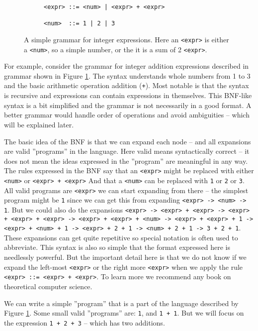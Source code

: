 \begin{figure}
\centering
\begin{subfigure}{.5\textwidth}
  \begin{verbatim}
<expr> ::= <num> | <expr> + <expr>

<num>  ::= 1 | 2 | 3
\end{verbatim}
\end{subfigure}
  \cprotect\caption{A simple grammar for integer expressions. Here an \verb|<expr>| is either a \verb|<num>|, so a simple number, or the it is a sum of 2 \verb|<expr>|.}
  \label{fig:bnfExpr}
\end{figure}
For example, consider the grammar for integer addition expressions described in grammar shown in Figure \ref{fig:bnfExpr}. The syntax understands whole numbers from 1 to 3 and the basic arithmetic operation addition (\verb!+!). Most notable is that the syntax is recursive and expressions can contain expressions in themselves. This BNF-like syntax is a bit simplified and the grammar is not necessarily in a good format. A better grammar would handle order of operations and avoid ambiguities -- which will be explained later.

The basic idea of the BNF is that we can expand each node -- and all expansions are valid ''programs'' in the language. Here valid means syntactically correct -- it does not mean the ideas expressed in the ''program'' are meaningful in any way. The rules expressed in the BNF say that an \verb|<expr>| might be replaced with either \verb|<num>| or \verb|<expr> + <expr>| And that a \verb|<num>| can be replaced with \verb|1| or \verb|2| or \verb|3|. All valid programs are \verb|<expr>| we can start expanding from there -- the simplest program might be \verb|1| since we can get this from expanding \verb|<expr> -> <num> -> 1|. But we could also do the expansions \verb|<expr> -> <expr> + <expr> -> <expr> + <expr> + <expr> -> <expr> + <expr> + <num> -> <expr> + <expr> + 1 -> <expr> + <num> + 1 -> <expr> + 2 + 1 -> <num> + 2 + 1 -> 3 + 2 + 1|. These expansions can get quite repetitive so special notation is often used to abbreviate. This syntax is also so simple that the format expressed here is needlessly powerful. But the important detail here is that we do not know if we expand the left-most \verb|<expr>| or the right more \verb|<expr>| when we apply the rule \verb|<expr> ::= <expr> + <expr>|. To learn more we recommend any book on theoretical computer science. 

We can write a simple ''program'' that is a part of the language described by Figure \ref{fig:bnfExpr}. Some small valid ''programs'' are: \verb!1!, and \verb!1 + 1!. But we will focus on the expression \verb!1 + 2 + 3! -- which has two additions.

